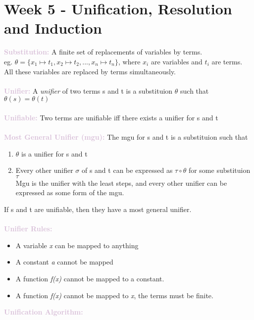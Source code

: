 \documentclass[a4paper,10pt]{article}
\begin{document}
\section*{Week 5 - Unification, Resolution and Induction}
\noindent \textcolor{Thistle}{\textbf{Substitution:}} A finite set of replacements of variables by terms. \\ 
eg. $\theta = \{x_{1} \mapsto t_{1}, x_{2} \mapsto t_{2}, ... , x_{n} \mapsto t_{n}\}$, where $x_{i}$ are variables and $t_{i}$ are terms. \\
All these variables are replaced by terms simultaneously. \\\\
\noindent \textcolor{Thistle}{\textbf{Unifier:}} A \emph{unifier} of two terms s and t is a substituion $\theta$ such that $\theta(s) = \theta(t)$\\ \\
\noindent \textcolor{Thistle}{\textbf{Unifiable:}} Two terms are unifiable iff there exists a unifier for s and t\\ \\
\noindent \textcolor{Thistle}{\textbf{Most General Unifier (mgu):}} The mgu for s and t is a substituion such that
\begin{enumerate}
\item $\theta$ is a unifier for s and t 
\item Every other unifier $\sigma$ of s and t can be expressed as $\tau \circ \theta$ for some substituion $\tau$ \\
Mgu is the unifier with the least steps, and every other unifier can be expressed as some form of the mgu. 
\end{enumerate}
If s and t are unifiable, then they have a most general unifier. \\\\
\noindent \textcolor{Thistle}{\textbf{Unifier Rules:}}
\renewcommand{\labelitemi}{\textperiodcentered}
\begin{itemize}
\item A variable \emph{x} can be mapped to anything 
\item A constant \emph{a} cannot be mapped 
\item A function \emph{f(x)} cannot be mapped to a constant. 
\item A function \emph{f(x)} cannot be mapped to \emph{x}, the terms must be finite. 
\end{itemize}
\noindent \textcolor{Thistle}{\textbf{Unification Algorithm:}} \\ \\
\end{document}
